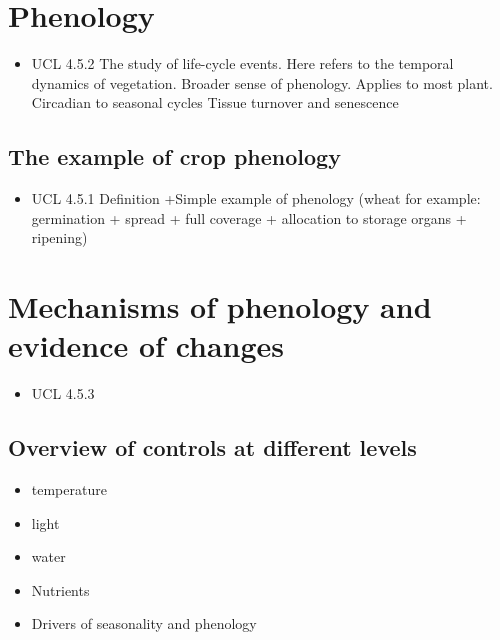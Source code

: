 \documentclass[
  oneside]{book}
\providecommand{\tightlist}{%
  \setlength{\itemsep}{0pt}\setlength{\parskip}{0pt}}
\begin{document}

\hypertarget{phenology}{%
\section{Phenology}\label{phenology}}

\begin{itemize}
\tightlist
\item
  UCL 4.5.2
  The study of life-cycle events. Here refers to the temporal dynamics of vegetation.
  Broader sense of phenology.
  Applies to most plant. Circadian to seasonal cycles
  Tissue turnover and senescence
\end{itemize}

\hypertarget{the-example-of-crop-phenology}{%
\subsection{The example of crop phenology}\label{the-example-of-crop-phenology}}

\begin{itemize}
\tightlist
\item
  UCL 4.5.1
  Definition +Simple example of phenology (wheat for example: germination + spread + full coverage + allocation to storage organs + ripening)
\end{itemize}

\hypertarget{mechanisms-of-phenology-and-evidence-of-changes}{%
\section{Mechanisms of phenology and evidence of changes}\label{mechanisms-of-phenology-and-evidence-of-changes}}

\begin{itemize}
\tightlist
\item
  UCL 4.5.3
\end{itemize}

\hypertarget{overview-of-controls-at-different-levels}{%
\subsection{Overview of controls at different levels}\label{overview-of-controls-at-different-levels}}

\begin{itemize}
\tightlist
\item
  temperature
\item
  light
\item
  water
\item
  Nutrients
\item
  Drivers of seasonality and phenology
\end{itemize}
\end{document}
